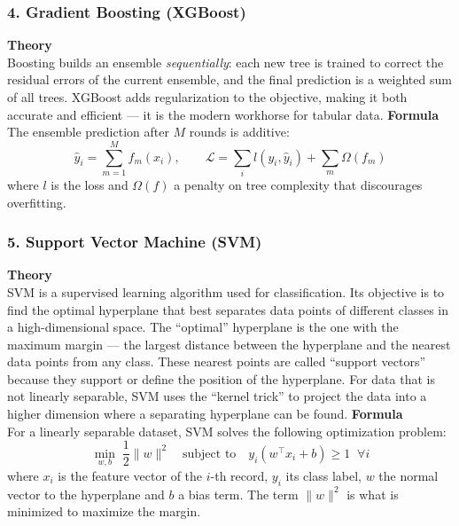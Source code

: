 \documentclass[12pt,a4paper]{article}
\begin{document}
\subsubsection*{4. Gradient Boosting (XGBoost)}
\textbf{Theory}\\
Boosting builds an ensemble \emph{sequentially}: each new tree is trained to correct
the residual errors of the current ensemble, and the final prediction is a weighted
sum of all trees. XGBoost adds regularization to the objective, making it both
accurate and efficient --- it is the modern workhorse for tabular data.
\textbf{Formula}\\
The ensemble prediction after $M$ rounds is additive:
\begin{equation}
  \hat{y}_i = \sum_{m=1}^{M} f_m(x_i), \qquad
  \mathcal{L} = \sum_i l(y_i, \hat{y}_i) + \sum_m \Omega(f_m)
\end{equation}
where $l$ is the loss and $\Omega(f)$ a penalty on tree complexity that discourages
overfitting.

\subsubsection*{5. Support Vector Machine (SVM)}
\textbf{Theory}\\
SVM is a supervised learning algorithm used for classification. Its objective is to
find the optimal hyperplane that best separates data points of different classes in a
high-dimensional space. The ``optimal'' hyperplane is the one with the maximum margin
--- the largest distance between the hyperplane and the nearest data points from any
class. These nearest points are called ``support vectors'' because they support or
define the position of the hyperplane. For data that is not linearly separable, SVM
uses the ``kernel trick'' to project the data into a higher dimension where a
separating hyperplane can be found.
\textbf{Formula}\\
For a linearly separable dataset, SVM solves the following optimization problem:
\begin{equation}
  \min_{w,b} \; \frac{1}{2}\lVert w \rVert^2
  \quad\text{subject to}\quad
  y_i(w^\top x_i + b) \ge 1 \;\; \forall i
\end{equation}
where $x_i$ is the feature vector of the $i$-th record, $y_i$ its class label, $w$
the normal vector to the hyperplane and $b$ a bias term. The term $\lVert w\rVert^2$
is what is minimized to maximize the margin.
\end{document}
